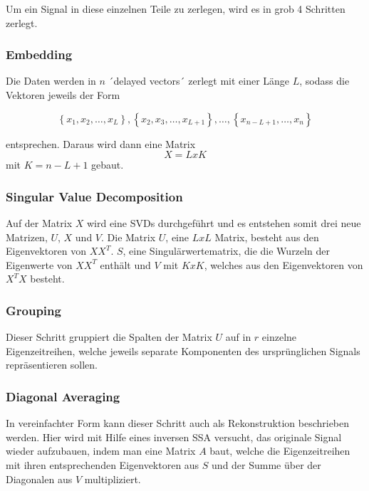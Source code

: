 Um ein Signal in diese einzelnen Teile zu zerlegen, wird es in grob 4 Schritten zerlegt.

\subsubsection*{Embedding}
Die Daten werden in \(n\) ´delayed vectors´ zerlegt mit einer Länge \(L\), sodass die Vektoren jeweils der Form

\begin{equation} 
    \label{for:Embedding}
    \left\{x_1, x_2, \ldots, x_L\right\}, \left\{x_2, x_3, \ldots, x_{L+1}\right\}, \ldots, \left\{x_{n-L+1}, \ldots, x_n\right\} 
\end{equation}

entsprechen. Daraus wird dann eine Matrix \[X = L x K\]  mit \(K =  n - L + 1\) gebaut.

\subsubsection*{Singular Value Decomposition}
Auf der Matrix \(X\) wird eine \acp{SVD} durchgeführt und es entstehen somit drei neue Matrizen,
\(U\), \(X\) und \(V\).
Die Matrix \(U\), eine \(L x L\) Matrix, besteht aus den Eigenvektoren von \(XX^T\).
\(S\), eine Singulärwertematrix, die die Wurzeln der Eigenwerte von \(XX^T\) enthält und \(V\) mit \(K x K\), welches aus den Eigenvektoren von \(X^TX\) besteht.

\subsubsection*{Grouping}
Dieser Schritt gruppiert die Spalten der Matrix \(U\) auf in \(r\) einzelne Eigenzeitreihen, welche jeweils separate Komponenten des ursprünglichen Signals repräsentieren sollen.

\subsubsection*{Diagonal Averaging}
In vereinfachter Form kann dieser Schritt auch als Rekonstruktion beschrieben werden. Hier wird mit Hilfe eines inversen \ac{SSA} versucht, das originale Signal wieder aufzubauen,
indem man eine Matrix \(A\) baut, welche die Eigenzeitreihen mit ihren entsprechenden Eigenvektoren aus \(S\) und der Summe über der Diagonalen aus \(V\) multipliziert.


